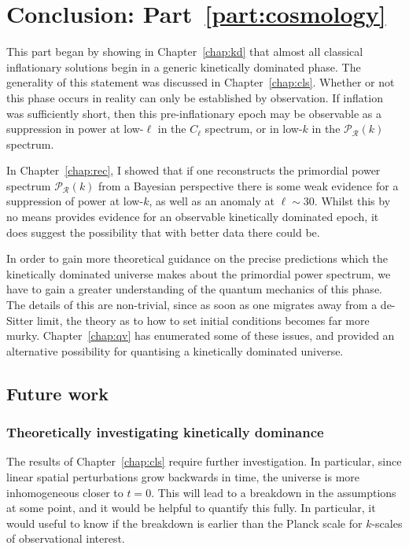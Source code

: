 \chapter*{Conclusion: Part~\ref{part:cosmology}}

This part began by showing in Chapter~\ref{chap:kd} that almost all classical inflationary solutions begin in a generic kinetically dominated phase. The generality of this statement was discussed in Chapter~\ref{chap:cls}. 
Whether or not this phase occurs in reality can only be established by observation. If inflation was sufficiently short, then this pre-inflationary epoch may be observable as a suppression in power at low-$\ell$ in the $C_\ell$ spectrum, or in low-$k$ in the $\mathcal{P}_\mathcal{R}(k)$ spectrum. 

In Chapter~\ref{chap:rec}, I showed that if one reconstructs the primordial power spectrum $\mathcal{P}_\mathcal{R}(k)$ from a Bayesian perspective there is some weak evidence for a suppression of power at low-$k$, as well as an anomaly at $\ell\sim30$. Whilst this by no means provides evidence for an observable kinetically dominated epoch, it does suggest the possibility that with better data there could be.

In order to gain more theoretical guidance on the precise predictions which the kinetically dominated universe makes about the primordial power spectrum, we have to gain a greater understanding of the quantum mechanics of this phase. The details of this are non-trivial, since as soon as one migrates away from a de-Sitter limit, the theory as to how to set initial conditions becomes far more murky. Chapter~\ref{chap:qv} has enumerated some of these issues, and provided an alternative possibility for quantising a kinetically dominated universe.

\section*{Future work}
\subsection*{Theoretically investigating kinetically dominance}
The results of Chapter~\ref{chap:cls} require further investigation. In particular, since linear spatial perturbations grow backwards in time, the universe is more inhomogeneous closer to $t=0$. This will lead to a breakdown in the assumptions at some point, and it would be helpful to quantify this fully. In particular, it would useful to know if the breakdown is earlier than the Planck scale for $k$-scales of observational interest.

